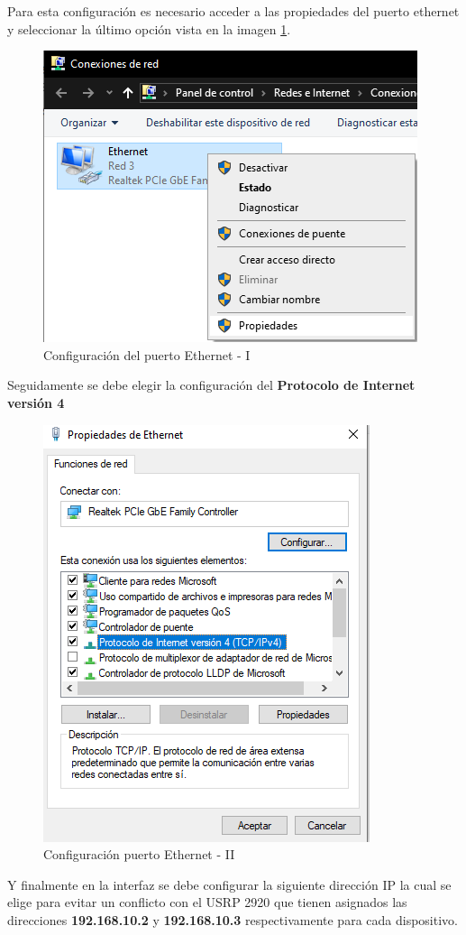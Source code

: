 \documentclass[12pt]{report}
\begin{document}
	Para esta configuración es necesario acceder a las propiedades del puerto ethernet y seleccionar la último opción vista en la imagen \ref{fig:conexion-ethernet}.
	
	\begin{figure}[h]
		\centering
		\includegraphics[width=0.4\linewidth]{media/conexion-ethernet}
		\caption{Configuración del puerto Ethernet - I}
		\label{fig:conexion-ethernet}
	\end{figure}
	
	Seguidamente se debe elegir la configuración del \textbf{Protocolo de Internet versión 4}
	
	\begin{figure}[h]
		\centering
		\includegraphics[width=0.4\linewidth]{media/conexion-ethernet2}
		\caption{Configuración puerto Ethernet - II}
		\label{fig:conexion-ethernet2}
	\end{figure}
	
	\newpage
	Y finalmente en la interfaz se debe configurar la siguiente dirección IP la cual se elige para evitar un conflicto con el USRP 2920 que tienen asignados las direcciones \textbf{192.168.10.2} y \textbf{192.168.10.3} respectivamente para cada dispositivo.
	
\end{document}
